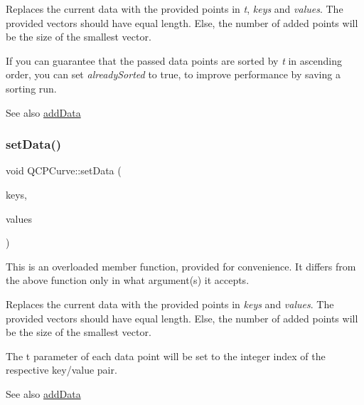 Replaces the current data with the provided points in {\itshape t}, {\itshape keys} and {\itshape values}. The provided vectors should have equal length. Else, the number of added points will be the size of the smallest vector.

If you can guarantee that the passed data points are sorted by {\itshape t} in ascending order, you can set {\itshape already\+Sorted} to true, to improve performance by saving a sorting run.

\begin{DoxySeeAlso}{See also}
\hyperlink{class_q_c_p_curve_a73edf394b94f3f24f07518e30565a07f}{add\+Data} 
\end{DoxySeeAlso}
\mbox{\label{class_q_c_p_curve_a9d3245d43304226e013240c94802f7f6}} 
\subsubsection{\texorpdfstring{set\+Data()}{setData()}\hspace{0.1cm}{\footnotesize\ttfamily [3/3]}}
{\footnotesize\ttfamily void Q\+C\+P\+Curve\+::set\+Data (\begin{DoxyParamCaption}\item[{const Q\+Vector$<$ double $>$ \&}]{keys,  }\item[{const Q\+Vector$<$ double $>$ \&}]{values }\end{DoxyParamCaption})}

This is an overloaded member function, provided for convenience. It differs from the above function only in what argument(s) it accepts.

Replaces the current data with the provided points in {\itshape keys} and {\itshape values}. The provided vectors should have equal length. Else, the number of added points will be the size of the smallest vector.

The t parameter of each data point will be set to the integer index of the respective key/value pair.

\begin{DoxySeeAlso}{See also}
\hyperlink{class_q_c_p_curve_a73edf394b94f3f24f07518e30565a07f}{add\+Data} 
\end{DoxySeeAlso}
\mbox{\label{class_q_c_p_curve_a4a377ec863ff81a1875c3094a6177c19}} 
